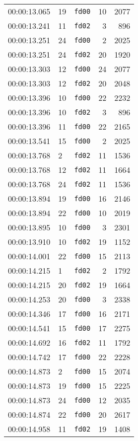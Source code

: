 \documentclass{article}
\begin{document}
\begin{longtable}{lllrr}
00:00:13.065 & 19 & \texttt{fd00} & 10 & 2077 \\
00:00:13.241 & 11 & \texttt{fd02} & 3 & 896 \\
00:00:13.251 & 24 & \texttt{fd00} & 2 & 2025 \\
00:00:13.251 & 24 & \texttt{fd02} & 20 & 1920 \\
00:00:13.303 & 12 & \texttt{fd00} & 24 & 2077 \\
00:00:13.303 & 12 & \texttt{fd02} & 20 & 2048 \\
00:00:13.396 & 10 & \texttt{fd00} & 22 & 2232 \\
00:00:13.396 & 10 & \texttt{fd02} & 3 & 896 \\
00:00:13.396 & 11 & \texttt{fd00} & 22 & 2165 \\
00:00:13.541 & 15 & \texttt{fd00} & 2 & 2025 \\
00:00:13.768 & 2 & \texttt{fd02} & 11 & 1536 \\
00:00:13.768 & 12 & \texttt{fd02} & 11 & 1664 \\
00:00:13.768 & 24 & \texttt{fd02} & 11 & 1536 \\
00:00:13.894 & 19 & \texttt{fd00} & 16 & 2146 \\
00:00:13.894 & 22 & \texttt{fd00} & 10 & 2019 \\
00:00:13.895 & 10 & \texttt{fd00} & 3 & 2301 \\
00:00:13.910 & 10 & \texttt{fd02} & 19 & 1152 \\
00:00:14.001 & 22 & \texttt{fd00} & 15 & 2113 \\
00:00:14.215 & 1 & \texttt{fd02} & 2 & 1792 \\
00:00:14.215 & 20 & \texttt{fd02} & 19 & 1664 \\
00:00:14.253 & 20 & \texttt{fd00} & 3 & 2338 \\
00:00:14.346 & 17 & \texttt{fd00} & 16 & 2171 \\
00:00:14.541 & 15 & \texttt{fd00} & 17 & 2275 \\
00:00:14.692 & 16 & \texttt{fd02} & 11 & 1792 \\
00:00:14.742 & 17 & \texttt{fd00} & 22 & 2228 \\
00:00:14.873 & 2 & \texttt{fd00} & 15 & 2074 \\
00:00:14.873 & 19 & \texttt{fd00} & 15 & 2225 \\
00:00:14.873 & 24 & \texttt{fd00} & 12 & 2035 \\
00:00:14.874 & 22 & \texttt{fd00} & 20 & 2617 \\
00:00:14.958 & 11 & \texttt{fd02} & 19 & 1408 \\

\end{longtable}
\end{document}
